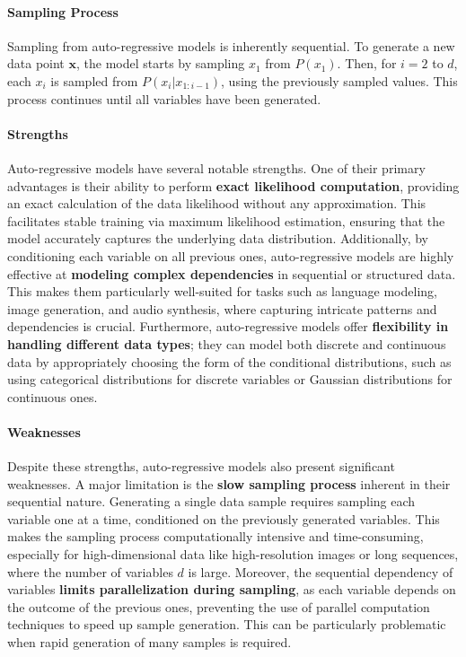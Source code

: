 \paragraph{Sampling Process}

Sampling from auto-regressive models is inherently sequential. To generate a new data point \( \mathbf{x} \), the model starts by sampling \( x_1 \) from \( P(x_1) \). Then, for \( i = 2 \) to \( d \), each \( x_i \) is sampled from \( P(x_i | x_{1:i-1}) \), using the previously sampled values. This process continues until all variables have been generated.

\paragraph{Strengths}

Auto-regressive models have several notable strengths. One of their primary advantages is their ability to perform \textbf{exact likelihood computation}, providing an exact calculation of the data likelihood without any approximation. This facilitates stable training via maximum likelihood estimation, ensuring that the model accurately captures the underlying data distribution. Additionally, by conditioning each variable on all previous ones, auto-regressive models are highly effective at \textbf{modeling complex dependencies} in sequential or structured data. This makes them particularly well-suited for tasks such as language modeling, image generation, and audio synthesis, where capturing intricate patterns and dependencies is crucial. Furthermore, auto-regressive models offer \textbf{flexibility in handling different data types}; they can model both discrete and continuous data by appropriately choosing the form of the conditional distributions, such as using categorical distributions for discrete variables or Gaussian distributions for continuous ones.

\paragraph{Weaknesses}

Despite these strengths, auto-regressive models also present significant weaknesses. A major limitation is the \textbf{slow sampling process} inherent in their sequential nature. Generating a single data sample requires sampling each variable one at a time, conditioned on the previously generated variables. This makes the sampling process computationally intensive and time-consuming, especially for high-dimensional data like high-resolution images or long sequences, where the number of variables \( d \) is large. Moreover, the sequential dependency of variables \textbf{limits parallelization during sampling}, as each variable depends on the outcome of the previous ones, preventing the use of parallel computation techniques to speed up sample generation. This can be particularly problematic when rapid generation of many samples is required.



